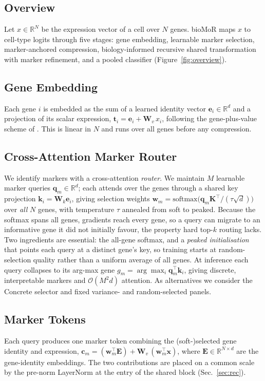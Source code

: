 \documentclass[letterpaper]{article}
\begin{document}
\subsection{Overview}
Let $x \in \mathbb{R}^{N}$ be the expression vector of a cell over $N$ genes. bioMoR
maps $x$ to cell-type logits through five stages: gene embedding, learnable marker
selection, marker-anchored compression, biology-informed recursive shared
transformation with marker refinement, and a pooled classifier
(Figure~\ref{fig:overview}).

\subsection{Gene Embedding}
Each gene $i$ is embedded as the sum of a learned identity vector
$\mathbf{e}_i \in \mathbb{R}^d$ and a projection of its scalar expression,
$\mathbf{t}_i = \mathbf{e}_i + \mathbf{W}_v\, x_i$, following the gene-plus-value
scheme of \cite{cui2024scgpt,theodoris2023transfer}. This is linear in $N$ and runs
over all genes before any compression.

\subsection{Cross-Attention Marker Router}
We identify markers with a cross-attention \emph{router}. We maintain $M$ learnable
marker queries $\mathbf{q}_m \in \mathbb{R}^{d}$; each attends over the genes through a
shared key projection $\mathbf{k}_i = \mathbf{W}_k \mathbf{e}_i$, giving selection
weights
$\mathbf{w}_m = \mathrm{softmax}\big(\mathbf{q}_m \mathbf{K}^{\top}/(\tau\sqrt{d})\big)$
over \emph{all} $N$ genes, with temperature $\tau$ annealed from soft to peaked.
Because the softmax spans all genes, gradients reach every gene, so a query can
migrate to an informative gene it did not initially favour, the property hard top-$k$
routing lacks. Two ingredients are essential: the all-gene softmax, and a
\emph{peaked initialisation} that points each query at a distinct gene's key, so
training starts at random-selection quality rather than a uniform average of all
genes. At inference each query collapses to its arg-max gene
$g_m = \arg\max_i \mathbf{q}_m^{\top}\mathbf{k}_i$, giving discrete, interpretable
markers and $\mathcal{O}(M^2 d)$ attention. As alternatives we consider the Concrete
selector \cite{balin2019concrete,jang2017categorical} and fixed variance- and
random-selected panels.

\subsection{Marker Tokens}
Each query produces one marker token combining the (soft-)selected gene identity and
expression,
$\mathbf{c}_m = (\mathbf{w}_m^{\top}\mathbf{E}) + \mathbf{W}_v\,(\mathbf{w}_m^{\top}\mathbf{x})$,
where $\mathbf{E}\in\mathbb{R}^{N\times d}$ are the gene-identity embeddings. The two
contributions are placed on a common scale by the pre-norm LayerNorm at the entry of
the shared block (Sec.~\ref{sec:rec}).
\end{document}
